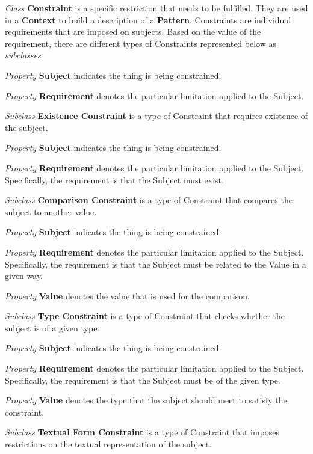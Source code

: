 \begin{description}
\item\textit{Class} \textbf{Constraint} is a specific restriction that needs to be fulfilled. They
are used in a \textbf{Context} to build a description of a \textbf{Pattern}. Constraints are
individual requirements that are imposed on subjects. Based on the value of the requirement, there
are different types of Constraints represented below as \textit{subclasses}.

\textit{Property} \textbf{Subject} indicates the thing is being constrained.

\textit{Property} \textbf{Requirement} denotes the particular limitation applied to the Subject.


\item\textit{Subclass} \textbf{Existence Constraint} is a type of Constraint that requires existence of the subject. 

\textit{Property} \textbf{Subject} indicates the thing is being constrained.

\textit{Property} \textbf{Requirement} denotes the particular limitation applied to the Subject. Specifically, the requirement is that the Subject must exist.


\item\textit{Subclass} \textbf{Comparison Constraint} is a type of Constraint that compares the subject to another value.

\textit{Property} \textbf{Subject} indicates the thing is being constrained.

\textit{Property} \textbf{Requirement} denotes the particular limitation applied to the Subject. Specifically, the requirement is that the Subject must be related to the Value in a given way.

\textit{Property} \textbf{Value} denotes the value that is used for the comparison.


\item\textit{Subclass} \textbf{Type Constraint} is a type of Constraint that checks whether the subject is of a given type.

\textit{Property} \textbf{Subject} indicates the thing is being constrained.

\textit{Property} \textbf{Requirement} denotes the particular limitation applied to the Subject. Specifically, the requirement is that the Subject must be of the given type.

\textit{Property} \textbf{Value} denotes the type that the subject should meet to satisfy the constraint.


\item\textit{Subclass} \textbf{Textual Form Constraint} is a type of Constraint that imposes restrictions on the textual representation of the subject.


\end{description}
